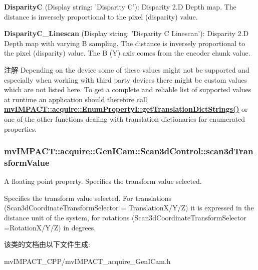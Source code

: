 \begin{DoxyItemize}
\item {\bfseries Disparity\+C} (Display string\+: 'Disparity C')\+: Disparity 2.\+D Depth map. The distance is inversely proportional to the pixel (disparity) value.
\item {\bfseries Disparity\+C\+\_\+\+Linescan} (Display string\+: 'Disparity C Linescan')\+: Disparity 2.\+D Depth map with varying B sampling. The distance is inversely proportional to the pixel (disparity) value. The B (Y) axis comes from the encoder chunk value.
\end{DoxyItemize}

\begin{DoxyNote}{注解}
Depending on the device some of these values might not be supported and especially when working with third party devices there might be custom values which are not listed here. To get a complete and reliable list of supported values at runtime an application should therefore call {\bfseries \hyperlink{classmv_i_m_p_a_c_t_1_1acquire_1_1_enum_property_i_a0ba6ccbf5ee69784d5d0b537924d26b6}{mv\+I\+M\+P\+A\+C\+T\+::acquire\+::\+Enum\+Property\+I\+::get\+Translation\+Dict\+Strings()}} or one of the other functions dealing with translation dictionaries for enumerated properties. 
\end{DoxyNote}
\hypertarget{classmv_i_m_p_a_c_t_1_1acquire_1_1_gen_i_cam_1_1_scan3d_control_a71eef75f73a7f863b0c134a3a6a2bc24}{
\subsubsection[{scan3d\+Transform\+Value}]{ mv\+I\+M\+P\+A\+C\+T\+::acquire\+::\+Gen\+I\+Cam\+::\+Scan3d\+Control\+::scan3d\+Transform\+Value}}\label{classmv_i_m_p_a_c_t_1_1acquire_1_1_gen_i_cam_1_1_scan3d_control_a71eef75f73a7f863b0c134a3a6a2bc24}


A floating point property. Specifies the transform value selected. 

Specifies the transform value selected. For translations (Scan3d\+Coordinate\+Transform\+Selector = Translation\+X/\+Y/\+Z) it is expressed in the distance unit of the system, for rotations (Scan3d\+Coordinate\+Transform\+Selector =Rotation\+X/\+Y/\+Z) in degrees. 

该类的文档由以下文件生成\+:\begin{DoxyCompactItemize}
\item 
mv\+I\+M\+P\+A\+C\+T\+\_\+\+C\+P\+P/mv\+I\+M\+P\+A\+C\+T\+\_\+acquire\+\_\+\+Gen\+I\+Cam.\+h\end{DoxyCompactItemize}
